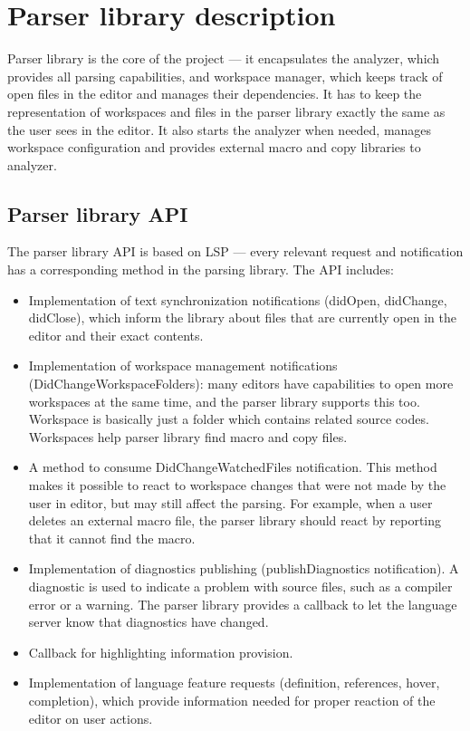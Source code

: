 \section{Parser library description}

Parser library is the core of the project --- it encapsulates the analyzer, which provides all parsing capabilities, and workspace manager, which keeps track of open files in the editor and manages their dependencies. It has to keep the representation of workspaces and files in the parser library exactly the same as the user sees in the editor. It also starts the analyzer when needed, manages workspace configuration and provides external macro and copy libraries to analyzer.

\subsection{Parser library API}
The parser library API is based on LSP --- every relevant request and notification has a corresponding method in the parsing library. The API includes:

\begin{itemize}
	\item Implementation of text synchronization notifications (didOpen, didChange, didClose), which inform the library about files that are currently open in the editor and their exact contents.
	\item Implementation of workspace management notifications (DidChangeWorkspaceFolders): many editors have capabilities to open more workspaces at the same time, and the parser library supports this too. Workspace is basically just a folder which contains related source codes. Workspaces help parser library find macro and copy files.
	\item A method to consume DidChangeWatchedFiles notification. This method makes it possible to react to workspace changes that were not made by the user in editor, but may still affect the parsing. For example, when a user deletes an external macro file, the parser library should react by reporting that it cannot find the macro.
	\item Implementation of diagnostics publishing (publishDiagnostics notification). A diagnostic is used to indicate a problem with source files, such as a compiler error or a warning. The parser library provides a callback to let the language server know that diagnostics have changed.
	\item Callback for highlighting information provision.
	\item Implementation of language feature requests (definition, references, hover, completion), which provide information needed for proper reaction of the editor on user actions.
\end{itemize}

